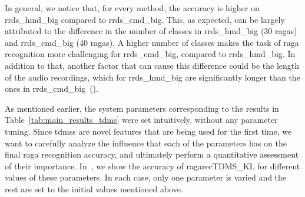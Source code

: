 In general, we notice that, for every method, the accuracy is higher on \acrshort{rrds_hmd_big} compared to \acrshort{rrds_cmd_big}. This, as expected, can be largely attributed to the difference in the number of classes in  \acrshort{rrds_hmd_big} (30 \glspl{raga}) and  \acrshort{rrds_cmd_big} (40 \glspl{raga}). A higher number of classes makes the task of \gls{raga} recognition more challenging for  \acrshort{rrds_cmd_big}, compared to  \acrshort{rrds_hmd_big}. In addition to that, another factor that can cause this difference could be the length of the audio recordings, which for  \acrshort{rrds_hmd_big} are significantly longer than the ones in \acrshort{rrds_cmd_big}~().

As mentioned earlier, the system parameters corresponding to the results in Table~\ref{tab:main_results_tdms} were set intuitively, without any parameter tuning. Since \glspl{tdms} are novel features that are being used for the first time, we want to carefully analyze the influence that each of the parameters has on the final \gls{raga} recognition accuracy, and ultimately perform a quantitative assessment of their importance. In~, we show the accuracy of \acrshort{ragarecTDMS_KL} for different values of these parameters. In each case, only one parameter is varied and the rest are set to the initial values mentioned above. 

